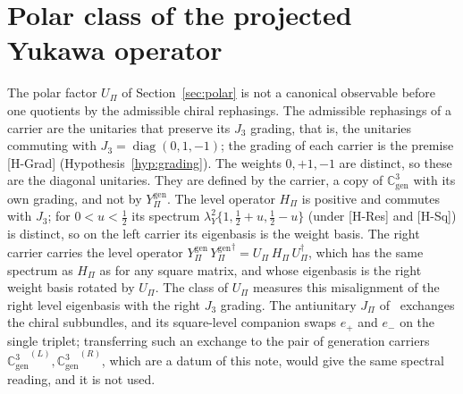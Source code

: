 \documentclass[11pt]{article}
\theoremstyle{definition}
\theoremstyle{remark}
\newcommand{\JPi}{J_{\Pi}}
\newcommand{\Jthree}{J_{3}}
\newcommand{\Cgen}{\mathbb{C}^{3}_{\mathrm{gen}}}
\newcommand{\GL}{{\Cgen}^{(L)}}
\newcommand{\GR}{{\Cgen}^{(R)}}
\newcommand{\Ygen}{{Y^{\mathrm{gen}}_{\Pi}}}
\newcommand{\Hpi}{H_{\Pi}}
\newcommand{\Upi}{U_{\Pi}}
\newcommand{\lamY}{\lambda_{Y}}
\newcommand{\diag}{\operatorname{diag}}
\begin{document}
  \section{Polar class of the projected Yukawa operator}
    \label{sec:polar-class}

    The polar factor $\Upi$ of Section~\ref{sec:polar} is not a canonical observable before one quotients by
    the admissible chiral rephasings.
    The admissible rephasings of a carrier are the unitaries that preserve its $\Jthree$ grading, that is, the unitaries
    commuting with $\Jthree = \diag(0, 1, -1)$; the grading of each carrier is the premise [H-Grad]
    (Hypothesis~\ref{hyp:grading}).
    The weights $0, +1, -1$ are distinct, so these are the diagonal unitaries.
    They are defined by the carrier, a copy of $\Cgen$ with its own grading, and not by $\Ygen$.
    The level operator $\Hpi$ is positive and commutes with $\Jthree$; for $0 < u < \tfrac12$ its spectrum
    $\lamY^{2}\{1, \tfrac12 + u, \tfrac12 - u\}$ (under [H-Res] and [H-Sq]) is distinct, so on the left carrier its
    eigenbasis is the weight basis.
    The right carrier carries the level operator $\Ygen\,\Ygen^{\dagger} = \Upi\,\Hpi\,\Upi^{\dagger}$, which has the
    same
    spectrum as $\Hpi$ as for any square matrix, and whose eigenbasis is the right weight basis rotated by $\Upi$.
    The class of $\Upi$ measures this misalignment of the right level eigenbasis with the right $\Jthree$ grading.
    The antiunitary $\JPi$ of~\cite{Beau2026prs} exchanges the chiral subbundles, and its square-level companion swaps
    $e_{+}$ and $e_{-}$ on the single triplet; transferring such an exchange to the pair of generation carriers
    $\GL, \GR$, which are a datum of this note, would give the same spectral reading, and it is not used.
\end{document}
